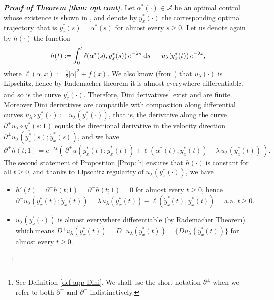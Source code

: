 \documentclass[12pt]{amsart}
\newcommand{\D}[1]{\mbox{\rm #1}}
\newcommand{\dd}{\D{d}}
\numberwithin{equation}{section}
\theoremstyle{plain}
\begin{document}

\begin{proof}[\textbf{Proof of Theorem \ref{thm: opt cont}}]
Let $\alpha^{*}(\cdot)\in \mathcal{A}$ be an optimal control whose existence is shown in \cite[Theorem 2.5]{huang2025control}, and denote by $y_{x}^{*}(\cdot)$ the corresponding optimal trajectory, that is $\dot{y}^{*}_{x}(s) = \alpha^{*}(s)$ for almost every $s\geq 0$. Let us denote again by $h(\cdot)$ the function
\begin{equation*}
    h(t) := \int_{0}^{t} \ell(\alpha^{*}(s), y_{x}^{*}(s))\, e^{-\lambda s}\;\dd s \, + \, u_{\lambda}(y_{x}^{*}(t))\,e^{-\lambda t},
\end{equation*}
where  $\ell(\alpha,x) := \frac{1}{2}|\alpha|^{2} + f(x)$. 
We also know (from \cite[Lemma 2.1 (iii)]{huang2025control}) that $u_{\lambda}(\cdot)$ is Lipschitz, hence by Rademacher theorem it is almost everywhere differentiable, and so is the curve $y^{*}_{x}(\cdot)$. Therefore, Dini derivatives\footnote{See Definition \ref{def app Dini}. We shall use the short notation $\partial^{\pm}$ when we refer to both $\partial^{+}$ and $\partial^{-}$ indistinctively.} exist and are finite. 
Moreover Dini derivatives are compatible with composition along differential curves $u_{\lambda}\circ y^{*}_{x}(\cdot):= u_{\lambda}(y^{*}_{x}(\cdot))$, that is, the derivative along the curve $\partial^{\pm}u_{\lambda}\circ y^{*}_{x}(s;1)$ equals the directional derivative in the velocity direction $\partial^{\pm}u_{\lambda}(y^{*}_{x}(s);\dot{y}^{*}_{x}(s))$, and we have
\begin{equation*}
    \partial^{\pm}h(t;1) = e^{-\lambda t}\left(\, \partial^{\pm}u(y^{*}_{x}(t);\dot{y}^{*}_{x}(t)) + \ell(\alpha^{*}(t),y^{*}_{x}(t)) - \lambda\,u_{\lambda}(y^{*}_{x}(t))\,\right).
\end{equation*}
The second statement of Proposition \ref{Prop: h} ensures that $h(\cdot)$ is constant for all $t\geq 0$, and thanks to Lipschitz regularity of $u_{\lambda}(y^{*}_{x}(\cdot))$, we have 
\begin{itemize}
    \item $h'(t) = \partial^{+}h(t;1) = \partial^{-}h(t;1) = 0$ for almost every $t\geq 0$, hence
    \begin{equation}\label{eq: h const}
        \partial^{-}u_{\lambda}(y^{*}_{x}(t);\dot{y}_{x}(t)) = \lambda\,u_{\lambda}(y^{*}_{x}(t)) - \ell(\dot{y}^{*}_{x}(t),y^{*}_{x}(t))   \quad \text{ a.a. } t\geq0.
    \end{equation}
    \item $u_{\lambda}(y^{*}_{x}(\cdot))$ is almost everywhere differentiable (by Rademacher Theorem) which means $D^{+}u_{\lambda}(y^{*}_{x}(t)) = D^{-}u_{\lambda}(y^{*}_{x}(t)) = \{Du_{\lambda}(y^{*}_{x}(t))\}$ for almost every $t\geq 0$.

\end{itemize}
\end{proof}
\end{document}
